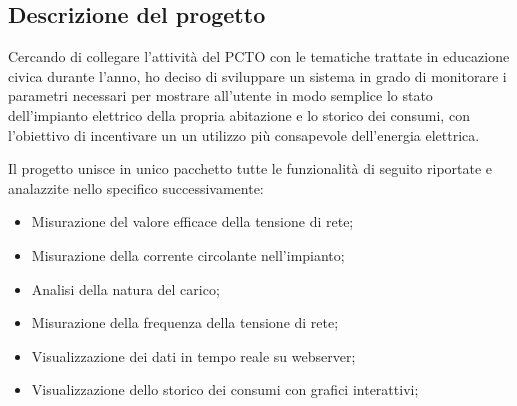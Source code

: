 \subsection{Descrizione del progetto}
Cercando di collegare l'attività del PCTO con le tematiche trattate in
educazione civica durante l'anno, ho deciso di sviluppare un sistema in grado di
monitorare i parametri necessari per mostrare all'utente in modo semplice lo
stato dell'impianto elettrico della propria abitazione e lo storico dei consumi,
con l'obiettivo di incentivare un un utilizzo più consapevole dell'energia
elettrica.

Il progetto unisce in unico pacchetto tutte le funzionalità di seguito riportate
e analazzite nello specifico successivamente:

\begin{itemize}
    \item Misurazione del valore efficace della tensione di rete;
    \item Misurazione della corrente circolante nell'impianto;
    \item Analisi della natura del carico;
    \item Misurazione della frequenza della tensione di rete;
    \item Visualizzazione dei dati in tempo reale su webserver;
    \item Visualizzazione dello storico dei consumi con grafici interattivi;
\end{itemize}